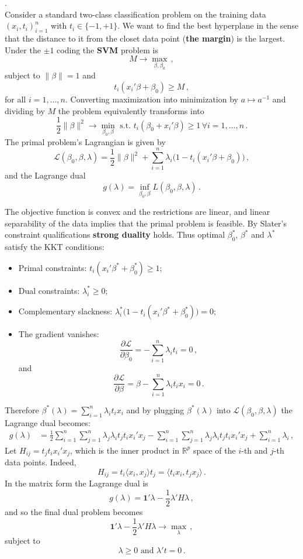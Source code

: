 \documentclass[a4paper]{article}
\newcommand{\Real}{\mathbb{R}}
\newcommand{\one}{\mathbf{1}}
\newcommand{\Lcal}{\mathcal{L}}
\begin{document}
 .\hfill\\
Consider a standard two-class classification problem on the training data
$(x_i,t_i)_{i=1}^n$ with $t_i\in\{-1,+1\}$. We want to find the best hyperplane
in the sense that the distance to it from the closet data point (\textbf{the margin})
is the largest. Under the $\pm1$ coding the \textbf{SVM} problem is
\[ M \to \max_{\beta, \beta_0}\,, \]
subject to $\|\beta\| = 1$ and
\[t_i(x_i'\beta + \beta_0) \geq M\,,\]
for all $i=1,\ldots,n$. Converting maximization into minimization by $a\mapsto a^{-1}$
and dividing by $M$ the problem equivalently transforms into
\[
\frac{1}{2}\|\beta\|^2 \to \min_{\beta_0,\beta}
\text{ s.t. }
t_i(\beta_0+x_i'\beta)\geq 1\,\forall i=1,\ldots,n\,.
\]
The primal problem's Lagrangian is given by
\[
\Lcal(\beta_0, \beta, \lambda)
= \frac{1}{2} \|\beta\|^2 + \sum_{i=1}^n \lambda_i \bigl( 1 - t_i(x_i'\beta+\beta_0) \bigr)\,,
\]
and the Lagrange dual
\[
g(\lambda) = \inf_{\beta_0,\beta} L(\beta_0, \beta, \lambda)\,.
\]

The objective function is convex and the restrictions are linear, and linear separability
of the data implies that the primal problem is feasible. By Slater's constraint
qualifications \textbf{strong duality} holds. Thus optimal $\beta_0^*$, $\beta^*$
and $\lambda^*$ satisfy the KKT conditions: \begin{itemize}
	\item Primal constraints: $t_i( x_i'\beta^* + \beta^*_0 )\geq1$;
	\item Dual constraints: $\lambda^*_i\geq 0$;
	\item Complementary slackness: $\lambda^*_i \bigl( 1 - t_i(x_i'\beta^*+\beta^*_0) \bigr) = 0$;
	\item The gradient vanishes:
	\[ \frac{\partial \Lcal}{\partial \beta_0} = - \sum_{i=1}^n \lambda_i t_i = 0\,, \]
	and
	\[ \frac{\partial \Lcal}{\partial \beta} = \beta - \sum_{i=1}^n \lambda_i t_i x_i = 0\,. \]
\end{itemize}
Therefore $\beta^*(\lambda) = \sum_{i=1}^n \lambda_i t_i x_i$ and by plugging
$\beta^*(\lambda)$ into $\Lcal(\beta_0, \beta, \lambda)$ the Lagrange dual becomes:
\begin{align*}
	g(\lambda)
	&= \frac{1}{2} \sum_{i=1}^n \sum_{j=1}^n \lambda_j \lambda_i t_j t_i x_i'x_j
		- \sum_{i=1}^n \sum_{j=1}^n \lambda_j \lambda_i t_j t_i x_i' x_j
		+ \sum_{i=1}^n \lambda_i\,,
\end{align*}
Let $H_{ij} = t_j t_i x_i' x_j$, which is the inner product in $\Real^p$ space of
the $i$-th and $j$-th data points. Indeed,
\[ H_{ij} = t_i \langle x_i, x_j \rangle t_j = \langle t_i x_i, t_j x_j \rangle \,.\]
In the matrix form the Lagrange dual is
\[ g(\lambda) = \one' \lambda - \frac{1}{2} \lambda'H\lambda \,, \]
and so the final dual problem becomes
\[ \one' \lambda - \frac{1}{2} \lambda' H \lambda \to \max_\lambda\,,\]
subject to
\[ \lambda \geq 0 \text{ and } \lambda' t = 0\,. \]
\end{document}
